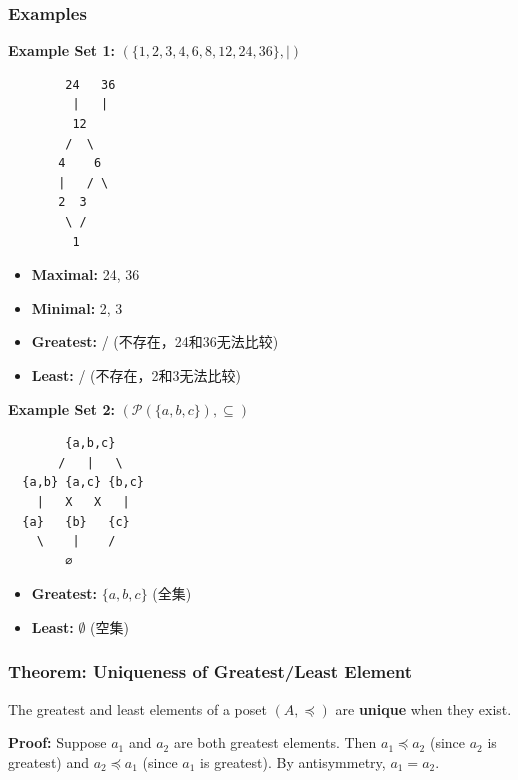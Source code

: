 \documentclass[10pt,a4paper,openany]{ctexbook}
\theoremstyle{definition}
\theoremstyle{remark}
\renewenvironment{quote}
  {\list{}{\leftmargin=1em\rightmargin=0pt\topsep=0.5pt\partopsep=0pt}\item[]}
  {\endlist}
\begin{document}
\subsubsection{Examples}

\textbf{Example Set 1:} $(\{1,2,3,4,6,8,12,24,36\}, \mid)$
{\footnotesize\begin{verbatim}
        24   36
         |   |
         12
        /  \
       4    6
       |   / \
       2  3
        \ /
         1
\end{verbatim}}

\begin{itemize}
\item \textbf{Maximal:} 24, 36
\item \textbf{Minimal:} 2, 3
\item \textbf{Greatest:} / (不存在，24和36无法比较)
\item \textbf{Least:} / (不存在，2和3无法比较)

\end{itemize}

\textbf{Example Set 2:} $(\mathcal{P}(\{a,b,c\}), \subseteq)$
{\footnotesize\begin{verbatim}
        {a,b,c}
       /   |   \
  {a,b} {a,c} {b,c}
    |   X   X   |
  {a}   {b}   {c}
    \    |    /
        ∅
\end{verbatim}}

\begin{itemize}
\item \textbf{Greatest:} $\{a,b,c\}$ (全集)
\item \textbf{Least:} $\emptyset$ (空集)

\end{itemize}

\subsubsection{Theorem: Uniqueness of Greatest/Least Element}

\begin{quote}
The greatest and least elements of a poset $(A, \preccurlyeq)$ are \textbf{unique} when they exist.

\textbf{Proof:} Suppose $a_1$ and $a_2$ are both greatest elements. Then $a_1 \preccurlyeq a_2$ (since $a_2$ is greatest) and $a_2 \preccurlyeq a_1$ (since $a_1$ is greatest). By antisymmetry, $a_1 = a_2$.

\end{quote}
\vspace{-2pt}
\end{document}
